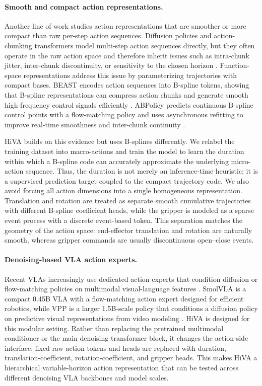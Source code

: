 \documentclass[10pt,twocolumn,letterpaper]{article}
\begin{document}
\paragraph{Smooth and compact action representations.}
Another line of work studies action representations that are smoother or more compact than raw per-step action sequences. Diffusion policies and action-chunking transformers model multi-step action sequences directly, but they often operate in the raw action space and therefore inherit issues such as intra-chunk jitter, inter-chunk discontinuity, or sensitivity to the chosen horizon \cite{act2023,diffusionpolicy2023,aac2026,abpolicy2026}. Function-space representations address this issue by parameterizing trajectories with compact bases. BEAST encodes action sequences into B-spline tokens, showing that B-spline representations can compress action chunks and generate smooth high-frequency control signals efficiently \cite{beast2025}. ABPolicy predicts continuous B-spline control points with a flow-matching policy and uses asynchronous refitting to improve real-time smoothness and inter-chunk continuity \cite{abpolicy2026}. 

HiVA builds on this evidence but uses B-splines differently. We relabel the training dataset into macro-actions and train the model to learn the duration within which a B-spline code can accurately approximate the underlying micro-action sequence. Thus, the duration is not merely an inference-time heuristic; it is a supervised prediction target coupled to the compact trajectory code. We also avoid forcing all action dimensions into a single homogeneous representation. Translation and rotation are treated as separate smooth cumulative trajectories with different B-spline coefficient heads, while the gripper is modeled as a sparse event process with a discrete event-based token. This separation matches the geometry of the action space: end-effector translation and rotation are naturally smooth, whereas gripper commands are usually discontinuous open--close events.

\paragraph{Denoising-based VLA action experts.}
Recent VLAs increasingly use dedicated action experts that condition diffusion or flow-matching policies on multimodal visual-language features \cite{smolvla2025,vpp2024,aac2026}. SmolVLA is a compact 0.45B VLA with a flow-matching action expert designed for efficient robotics, while VPP is a larger 1.5B-scale policy that conditions a diffusion policy on predictive visual representations from video modeling \cite{smolvla2025,vpp2024}. HiVA is designed for this modular setting. Rather than replacing the pretrained multimodal conditioner or the main denoising transformer block, it changes the action-side interface: fixed raw-action tokens and heads are replaced with duration, translation-coefficient, rotation-coefficient, and gripper heads. This makes HiVA a hierarchical variable-horizon action representation that can be tested across different denoising VLA backbones and model scales.
\end{document}
